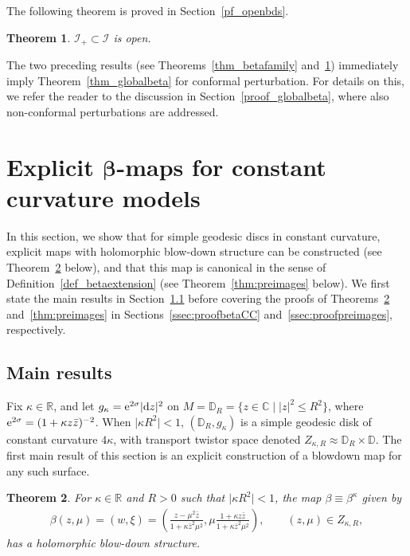 \documentclass[pdftex]{sigma}
\numberwithin{equation}{section}
\newtheorem{Theorem}{Theorem}[section]
\theoremstyle{definition}
\newcommand{\1}{{\bf 1}}
\newcommand \Cm { \mathbb{C}}
\newcommand \Dm { \mathbb{D}}
\newcommand \Rm { \mathbb{R}}
\newcommand \zbar { \bar{z}}
\begin{document}
The following theorem is proved in Section~\ref{pf_openbds}.

\begin{Theorem}\label{thm_openbds} $\mathcal I_+\subset \mathcal I$ is open.
\end{Theorem}



The two preceding results (see Theorems~\ref{thm_betafamily} and~\ref{thm_openbds}) immediately imply Theorem~\ref{thm_globalbeta} for conformal perturbation. For details on this, we refer the reader to the discussion in Section~\ref{proof_globalbeta}, where also non-conformal perturbations are addressed.

\section[Explicit beta-maps for constant curvature models]{Explicit $\boldsymbol{\beta}$-maps for constant curvature models}\label{s_fra}

In this section, we show that for simple geodesic discs in constant curvature, explicit maps with holomorphic blow-down structure can be constructed (see Theorem~\ref{thm:betaCC} below), and that this map is canonical in the sense of Definition~\ref{def_betaextension} (see Theorem~\ref{thm:preimages} below). We first state the main results in Section~\ref{ssec:main} before covering the proofs of Theorems~\ref{thm:betaCC} and~\ref{thm:preimages} in Sections~\ref{ssec:proofbetaCC} and~\ref{ssec:proofpreimages}, respectively.

\subsection{Main results} \label{ssec:main}

Fix $\kappa\in \Rm$, and let $g_\kappa = {\rm e}^{2\sigma} |{\rm d}z|^2$ on $M = \Dm_R = \big\{z\in \Cm \mid |z|^2\le R^2\big\}$, where ${\rm e}^{2\sigma} = (1+\kappa z\zbar)^{-2}$. When $\big|\kappa R^2\big|<1$, $(\Dm_R, g_\kappa)$ is a simple geodesic disk of constant curvature $4\kappa${, with transport twistor space denoted $Z_{\kappa,R}\approx \Dm_R\times \Dm$}. The first main result of this section is an explicit construction of a blowdown map for any such surface.

\begin{Theorem}\label{thm:betaCC}
 For $\kappa\in \Rm$ and $R>0$ such that $\big|\kappa R^2\big|<1$, the map $\beta \equiv \beta^\kappa$ given by
 \begin{align}
	 \beta (z,\mu) = (w,\xi) = \left( \frac{z-\mu^2\zbar}{1+\kappa \zbar^2 \mu^2}, \mu \frac{1+\kappa z\zbar}{1+\kappa\zbar^2 \mu^2} \right), \qquad (z,\mu)\in Z_{\kappa,R},
	\label{eq:betakappa}
 \end{align}
 has a holomorphic blow-down structure.
\end{Theorem}
\end{document}
